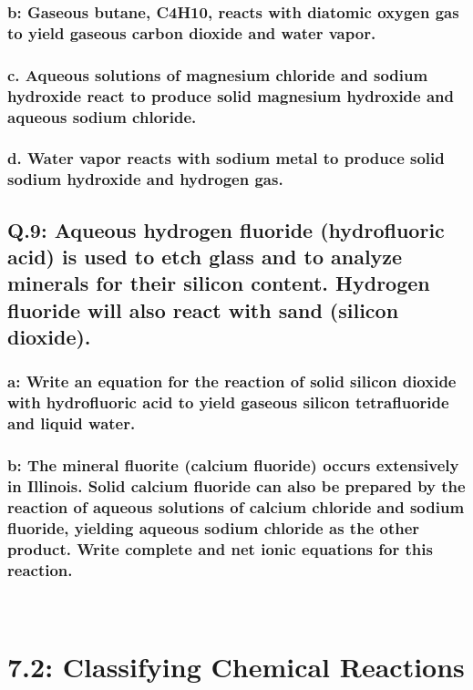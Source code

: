 \documentclass[10pt, letterpaper]{article}
\begin{document}
\subsubsection*{b: Gaseous butane, C4H10, reacts with diatomic oxygen gas
to yield gaseous carbon dioxide and water vapor.}
\subsubsection*{c. Aqueous solutions of magnesium chloride and sodium hydroxide
react to produce solid magnesium hydroxide and aqueous sodium chloride.}
\subsubsection*{d. Water vapor reacts with sodium metal to produce
solid sodium hydroxide and hydrogen gas.}

\subsection*{Q.9: Aqueous hydrogen fluoride (hydrofluoric acid) is used to
etch glass and to analyze minerals for their silicon content.
Hydrogen fluoride will also react with sand (silicon dioxide).}
\subsubsection*{a: Write an equation for the reaction of solid silicon dioxide
with hydrofluoric acid to yield gaseous silicon tetrafluoride and liquid water.}
\subsubsection*{b: The mineral fluorite (calcium fluoride) occurs extensively
in Illinois. Solid calcium fluoride can also be prepared by the reaction of
aqueous solutions of calcium chloride and sodium fluoride, yielding
aqueous sodium chloride as the other product.
Write complete and net ionic equations for this reaction.}
\\
\section*{7.2: Classifying Chemical Reactions}
\end{document}
